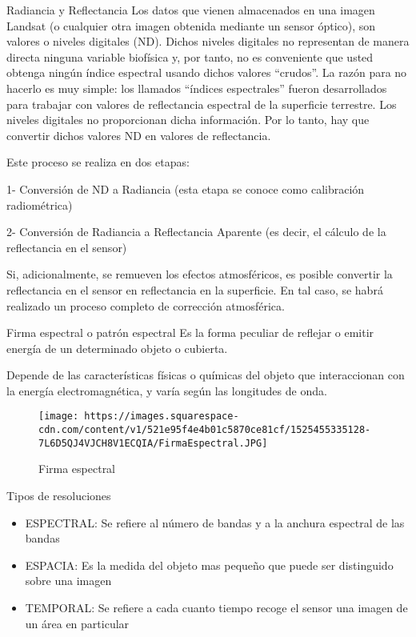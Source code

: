 \documentclass[
  ignorenonframetext,
]{beamer}
\begin{document}
\begin{frame}{Radiancia y Reflectancia}
\protect\hypertarget{radiancia-y-reflectancia}{}
Los datos que vienen almacenados en una imagen Landsat (o cualquier otra
imagen obtenida mediante un sensor óptico), son valores o niveles
digitales (ND). Dichos niveles digitales no representan de manera
directa ninguna variable biofísica y, por tanto, no es conveniente que
usted obtenga ningún índice espectral usando dichos valores ``crudos''.
La razón para no hacerlo es muy simple: los llamados ``índices
espectrales'' fueron desarrollados para trabajar con valores de
reflectancia espectral de la superficie terrestre. Los niveles digitales
no proporcionan dicha información. Por lo tanto, hay que convertir
dichos valores ND en valores de reflectancia.

Este proceso se realiza en dos etapas:

1- Conversión de ND a Radiancia (esta etapa se conoce como calibración
radiométrica)

2- Conversión de Radiancia a Reflectancia Aparente (es decir, el cálculo
de la reflectancia en el sensor)

Si, adicionalmente, se remueven los efectos atmosféricos, es posible
convertir la reflectancia en el sensor en reflectancia en la superficie.
En tal caso, se habrá realizado un proceso completo de corrección
atmosférica.
\end{frame}

\begin{frame}{Firma espectral o patrón espectral}
\protect\hypertarget{firma-espectral-o-patruxf3n-espectral}{}
Es la forma peculiar de reflejar o emitir energía de un determinado
objeto o cubierta.

Depende de las características físicas o químicas del objeto que
interaccionan con la energía electromagnética, y varía según las
longitudes de onda.

\begin{figure}
\centering
\texttt{[image: https://images.squarespace-cdn.com/content/v1/521e95f4e4b01c5870ce81cf/1525455335128-7L6D5QJ4VJCH8V1ECQIA/FirmaEspectral.JPG]}
\caption{Firma espectral}
\end{figure}
\end{frame}

\begin{frame}{Tipos de resoluciones}
\protect\hypertarget{tipos-de-resoluciones}{}
\begin{itemize}
\item
  ESPECTRAL: Se refiere al número de bandas y a la anchura espectral de
  las bandas
\item
  ESPACIA: Es la medida del objeto mas pequeño que puede ser distinguido
  sobre una imagen
\item
  TEMPORAL: Se refiere a cada cuanto tiempo recoge el sensor una imagen
  de un área en particular
\end{itemize}
\end{frame}
\end{document}
